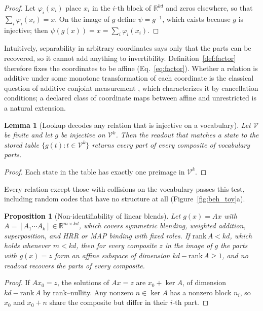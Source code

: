 \documentclass[10pt]{article}
\theoremstyle{plain}
\newtheorem{proposition}{Proposition}
\newtheorem{lemma}{Lemma}
\theoremstyle{remark}
\newcommand{\R}{\mathbb{R}}
\newcommand{\Voc}{\mathcal{V}}
\begin{document}
\begin{proof}
Let $\varphi_i(x_i)$ place $x_i$ in the $i$-th block of $\R^{kd}$ and zeros elsewhere, so that $\sum_i \varphi_i(x_i) = x$. On the image of $g$ define $\psi = g^{-1}$, which exists because $g$ is injective; then $\psi(g(x)) = x = \sum_i \varphi_i(x_i)$.
\end{proof}

\noindent
Intuitively, separability in arbitrary coordinates says only that the parts can be recovered, so it cannot add anything to invertibility. Definition~\ref{def:factor} therefore fixes the coordinates to be affine (Eq.~\ref{eq:factor}). Whether a relation is additive under some monotone transformation of each coordinate is the classical question of additive conjoint measurement \citep{luce1964}, which characterizes it by cancellation conditions; a declared class of coordinate maps between affine and unrestricted is a natural extension.

\begin{lemma}[Lookup decodes any relation that is injective on a vocabulary]
\label{lem:lookup}
Let $\Voc$ be finite and let $g$ be injective on $\Voc^k$. Then the readout that matches a state to the stored table $\{g(t) : t \in \Voc^k\}$ returns every part of every composite of vocabulary parts.
\end{lemma}

\begin{proof}
Each state in the table has exactly one preimage in $\Voc^k$.
\end{proof}

\noindent
Every relation except those with collisions on the vocabulary passes this test, including random codes that have no structure at all (Figure~\ref{fig:beh_toy}a).



\begin{proposition}[Non-identifiability of linear blends]
\label{prop:fiber}
Let $g(x) = Ax$ with $A = [A_1 \cdots A_k] \in \R^{m \times kd}$, which covers symmetric blending, weighted addition, superposition, and HRR or MAP binding with fixed roles. If $\mathrm{rank}\,A < kd$, which holds whenever $m < kd$, then for every composite $z$ in the image of $g$ the parts with $g(x) = z$ form an affine subspace of dimension $kd - \mathrm{rank}\,A \geq 1$, and no readout recovers the parts of every composite.
\end{proposition}

\begin{proof}
If $Ax_0 = z$, the solutions of $Ax = z$ are $x_0 + \ker A$, of dimension $kd - \mathrm{rank}\,A$ by rank--nullity. Any nonzero $n \in \ker A$ has a nonzero block $n_i$, so $x_0$ and $x_0 + n$ share the composite but differ in their $i$-th part.
\end{proof}
\end{document}
